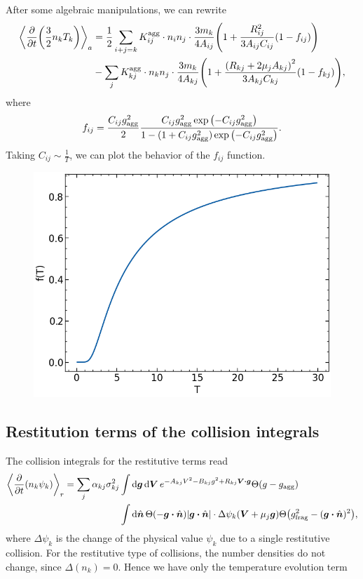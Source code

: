 \documentclass[aps,prl,preprint,groupedaddress,10pt]{revtex4-2}
\begin{document}
After some algebraic manipulations, we can rewrite
\begin{equation}
    \begin{split}
        \avg{\pdv{t}\pqty{\frac{3}{2}n_k T_k}}_a&=\frac{1}{2}\sum_{i+j=k}
        \utx{K}{agg}_{ij}\cdot n_in_j\cdot\frac{3m_k}{4A_{ij}}
        \pqty{1+\frac{R_{ij}^2}{3A_{ij}C_{ij}}\pqty{1-f_{ij}}}\\
        &-\sum_{j}\utx{K}{agg}_{kj}\cdot n_kn_j\cdot\frac{3m_k}{4A_{kj}}
        \pqty{1+\frac{\pqty{R_{kj}+2\mu_jA_{kj}}^2}{3A_{kj}C_{kj}}\pqty{1-f_{kj}}},
    \end{split}
\end{equation}
where
\begin{equation}
    f_{ij}=\frac{C_{ij}\ltx{g}{agg}^2}{2}
    \frac{C_{ij}\ltx{g}{agg}^2\exp\pqty{-C_{ij}\ltx{g}{agg}^2}}
    {1-(1+C_{ij}\ltx{g}{agg}^2)\exp\pqty{-C_{ij}\ltx{g}{agg}^2}}.
\end{equation}
Taking $C_{ij}\sim\frac{1}{T}$, we can plot the behavior of the $f_{ij}$ function.
\begin{figure}[!ht]
    \centerline{\includegraphics[width=0.5\paperwidth]{code/f_T.png}}
\end{figure}

\subsection{Restitution terms of the collision integrals}
The collision integrals for the restitutive terms read
\begin{equation}
    \begin{split}
        \avg{\pdv{t}(n_k\psi_k)}_r=\sum_{j}\alpha_{kj}\sigma_{kj}^2&\int
        \dd{\bg}\dd{\bV}e^{-A_{kj}V^2-B_{kj}g^2+R_{kj}\bV\vdot\bg}\Theta(g-\ltx{g}{agg})\\
        &\int\dd{\bn}\Theta\pqty{-\bg\vdot\bn}\abs{\bg\vdot\bn}\cdot
        \Delta\psi_k(\bV+\mu_j\bg)\Theta\pqty{\ltx{g}{frag}^2-(\bg\vdot\bn)^2},
    \end{split}
\end{equation}
where $\Delta\psi_k$ is the change of the physical value $\psi_k$ due to a single
restitutive collision. For the restitutive type of collisions, the number densities do not
change, since $\Delta(n_k)=0$. Hence we have only the temperature evolution term
\end{document}
